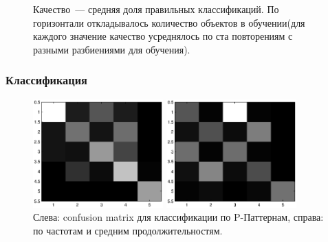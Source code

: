 \documentclass[smaller]{beamer}
\begin{document}
\begin{frame}

\begin{figure}[h]
\noindent{}
\caption{ Качество~--- средняя доля правильных классификаций.
По горизонтали откладывалось количество объектов в обучении(для каждого значение качество усреднялось по ста повторениям с разными разбиениями для обучения).
 }
\end{figure}
\end{frame}

\begin{frame}
  \frametitle{Классификация}
\begin{figure}[H]
	\begin{multicols}{2}
	\hfill
	\includegraphics[width=50mm]{confusion_Ppat.eps}

	\includegraphics[width=50mm]{confusion_freq.eps}
	\end{multicols}
	\caption{Слева: confusion matrix для классификации по P-Паттернам, справа: по частотам и средним продолжительностям.}
\end{figure}
\end{frame}
\end{document}
